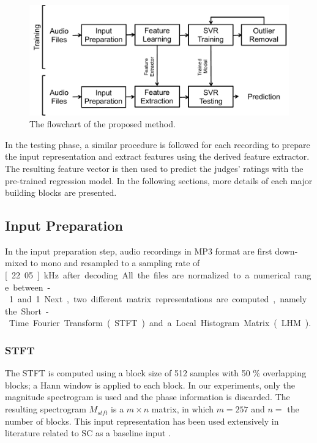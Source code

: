 \documentclass{article}
\begin{document}
\begin{figure}
\centering
\includegraphics[width = 8 cm]{./figs/flowchart.pdf}
\caption{The flowchart of the proposed method.}
\label{fig:flowchart}
\end{figure}

In the testing phase, a similar procedure is followed for each recording to prepare the input representation and extract features using the derived feature extractor. The resulting feature vector is then used to predict the judges' ratings with the pre-trained regression model. In the following sections, more details of each major building blocks are presented. 

\subsection{Input Preparation}\label{subsec:input}
In the input preparation step, audio recordings in MP3 format are first down-mixed to mono and resampled to a sampling rate of \unit[22.05]{kHz} after decoding. All the files are normalized to a numerical range between -1 and 1. Next, two different matrix representations are computed, namely the Short-Time Fourier Transform (STFT) and a Local Histogram Matrix (LHM). 

\subsubsection{STFT}\label{subsec:stft}
The STFT is computed using a block size of 512 samples with 50 \% overlapping blocks; a Hann window is applied to each block. In our experiments, only the magnitude spectrogram is used and the phase information is discarded. The resulting spectrogram $M_{stft}$ is a $m \times n$ matrix, in which $m = 257$ and $n = $ the number of blocks. This input representation has been used extensively in literature related to SC as a baseline input \cite{Su2014Guitar, Su2014Violin}. 
\end{document}
